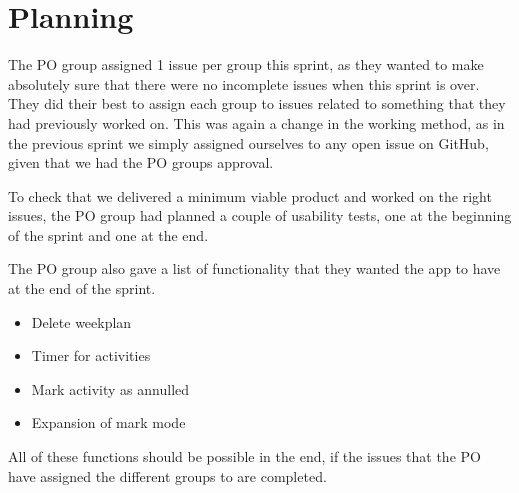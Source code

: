 \section{Planning}
The PO group assigned 1 issue per group this sprint, as they wanted to make absolutely sure that there were no incomplete issues when this sprint is over. 
They did their best to assign each group to issues related to something that they had previously worked on.
This was again a change in the working method, as in the previous sprint we simply assigned ourselves to any open issue on GitHub, given that we had the PO groups approval.

To check that we delivered a minimum viable product and worked on the right issues, the PO group had planned a couple of usability tests, one at the beginning of the sprint and one at the end.

The PO group also gave a list of functionality that they wanted the app to have at the end of the sprint.

\begin{itemize}
  \item Delete weekplan
  \item Timer for activities
  \item Mark activity as annulled 
  \item Expansion of mark mode
\end{itemize}

All of these functions should be possible in the end, if the issues that the PO have assigned the different groups to are completed.
